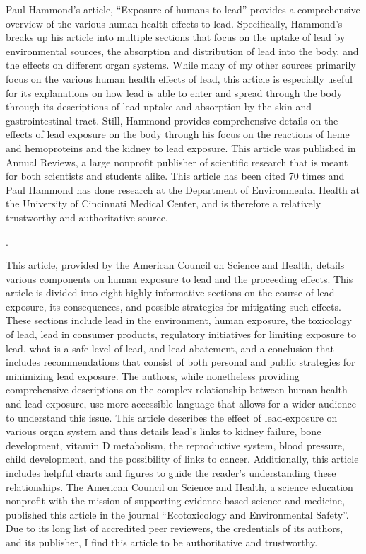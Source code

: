 \documentclass{article}
\begin{document}
\bigskip
Paul Hammond’s article, “Exposure of humans to lead” provides a comprehensive overview of the various human health effects to lead. Specifically, Hammond’s breaks up his article into multiple sections that focus on the uptake of lead by environmental sources, the absorption and distribution of lead into the body, and the effects on different organ systems.  While many of my other sources primarily focus on the various human health effects of lead, this article is especially useful for its explanations on how lead is able to enter and spread through the body through its descriptions of lead uptake and absorption by the skin and gastrointestinal tract. Still, Hammond provides comprehensive details on the effects of lead exposure on the body through his focus on the reactions of heme and hemoproteins and the kidney to lead exposure.  This article was published in Annual Reviews, a large nonprofit publisher of scientific research that is meant for both scientists and students alike. This article has been cited 70 times and Paul Hammond has done research at the Department of Environmental Health at the University of Cincinnati Medical Center, and is therefore a relatively trustworthy and authoritative source.

\bigskip
{}. 

\bigskip
This article, provided by the American Council on Science and Health, details various components on human exposure to lead and the proceeding effects. This article is divided into eight highly informative sections on the course of lead exposure, its consequences, and possible strategies for mitigating such effects. These sections include lead in the environment, human exposure, the toxicology of lead, lead in consumer products, regulatory initiatives for limiting exposure to lead, what is a safe level of lead, and lead abatement, and a conclusion that includes recommendations that consist of both personal and public strategies for minimizing lead exposure.  The authors, while nonetheless providing comprehensive descriptions on the complex relationship between human health and lead exposure, use more accessible language that allows for a wider audience to understand this issue. This article describes the effect of lead-exposure on various organ system and thus details lead’s links to kidney failure, bone development, vitamin D metabolism, the reproductive system, blood pressure, child development, and the possibility of links to cancer.  Additionally, this article includes helpful charts and figures to guide the reader’s understanding these relationships. The American Council on Science and Health, a science education nonprofit with the mission of supporting evidence-based science and medicine, published this article in the journal “Ecotoxicology and Environmental Safety”. Due to its long list of accredited peer reviewers, the credentials of its authors, and its publisher, I find this article to be authoritative and trustworthy. 
\end{document}
